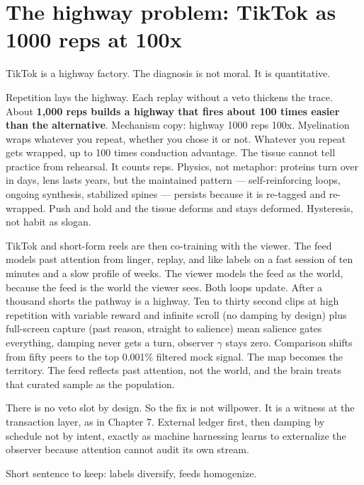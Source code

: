 \section{The highway problem: TikTok as 1000 reps at 100x}

TikTok is a highway factory. The diagnosis is not moral. It is quantitative.

Repetition lays the highway. Each replay without a veto thickens the trace. About \textbf{1,000 reps builds a highway that fires about 100 times easier than the alternative}. Mechanism copy: highway 1000 reps 100x. Myelination wraps whatever you repeat, whether you chose it or not. Whatever you repeat gets wrapped, up to 100 times conduction advantage. The tissue cannot tell practice from rehearsal. It counts reps. Physics, not metaphor: proteins turn over in days, lens lasts years, but the maintained pattern --- self-reinforcing loops, ongoing synthesis, stabilized spines --- persists because it is re-tagged and re-wrapped. Push and hold and the tissue deforms and stays deformed. Hysteresis, not habit as slogan.

TikTok and short-form reels are then co-training with the viewer. The feed models past attention from linger, replay, and like labels on a fast session of ten minutes and a slow profile of weeks. The viewer models the feed as the world, because the feed is the world the viewer sees. Both loops update. After a thousand shorts the pathway is a highway. Ten to thirty second clips at high repetition with variable reward and infinite scroll (no damping by design) plus full-screen capture (past reason, straight to salience) mean salience gates everything, damping never gets a turn, observer $\gamma$ stays zero. Comparison shifts from fifty peers to the top 0.001\% filtered mock signal. The map becomes the territory. The feed reflects past attention, not the world, and the brain treats that curated sample as the population.

There is no veto slot by design. So the fix is not willpower. It is a witness at the transaction layer, as in Chapter 7. External ledger first, then damping by schedule not by intent, exactly as machine harnessing learns to externalize the observer because attention cannot audit its own stream.

Short sentence to keep: labels diversify, feeds homogenize.

